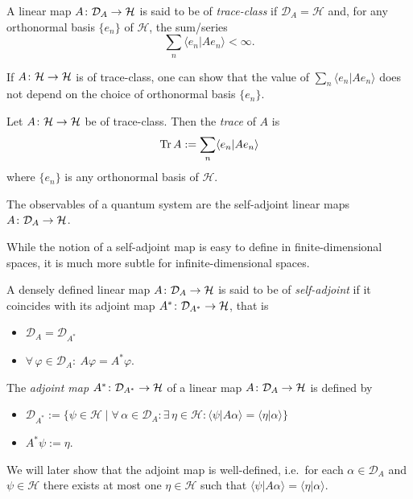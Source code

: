 \begin{definition}
A linear map $A\colon\mathcal{D}_A\to \mathcal{H}$ is said to be of \emph{trace-class} if $\mathcal{D}_A=\mathcal{H}$ and, for any orthonormal basis $\{e_n\}$ of $\mathcal{H}$, the sum/series
\begin{equation*}
\sum_n \langle e_n|Ae_n\rangle < \infty.
\end{equation*}
\end{definition}
If $A\colon\mathcal{H}\to \mathcal{H}$ is of trace-class, one can show that the value of $\sum_n \langle e_n|Ae_n\rangle$ does not depend on the choice of orthonormal basis $\{e_n\}$. 
\begin{definition}
Let $A\colon\mathcal{H}\to \mathcal{H}$ be of trace-class. Then the \emph{trace} of $A$ is
\begin{equation*}
\operatorname{Tr} A :=\sum_n \langle e_n|Ae_n\rangle 
\end{equation*}
where $\{e_n\}$ is any orthonormal basis of $\mathcal{H}$.
\end{definition}
\begin{tcolorbox}[colframe=blue!10!black]
\begin{axiom}[Observables]
The observables of a quantum system are the self-adjoint linear maps $A\colon\mathcal{D}_A\to \mathcal{H}$.
\end{axiom}
\end{tcolorbox}
While the notion of a self-adjoint map is easy to define in finite-dimensional spaces, it is much more subtle for infinite-dimensional spaces.

\begin{definition}
A densely defined linear map $A\colon\mathcal{D}_A\to \mathcal{H}$ is said to be of \emph{self-adjoint} if it coincides with its adjoint map $A^*\colon\mathcal{D}_{A^*}\to \mathcal{H}$, that is
\begin{itemize}
\item $\mathcal{D}_A=\mathcal{D}_{A^*}$
\item $\forall \, \varphi\in\mathcal{D}_A : \ A\varphi=A^*\varphi$.
\end{itemize}
\end{definition}
\begin{definition}
The \emph{adjoint map} $A^*\colon\mathcal{D}_{A^*}\to \mathcal{H}$ of a linear map $A\colon\mathcal{D}_A\to \mathcal{H}$ is defined by
\begin{itemize}
\item $\mathcal{D}_{A^*}:=\{\psi\in\mathcal{H}\mid \forall \, \alpha \in \mathcal{D}_A:\exists \, \eta \in \mathcal{H} : \langle\psi|A\alpha\rangle=\langle\eta|\alpha\rangle\}$
\item $A^*\psi:=\eta$.
\end{itemize}
\end{definition}
We will later show that the adjoint map is well-defined, i.e.\ for each $\alpha\in\mathcal{D}_A$ and $\psi\in\mathcal{H}$ there exists at most one $\eta\in\mathcal{H}$ such that $\langle\psi|A\alpha\rangle = \langle\eta|\alpha\rangle$.

